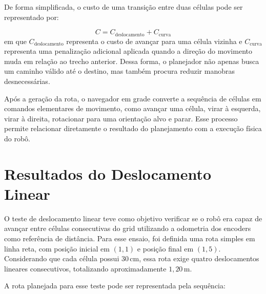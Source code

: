 \documentclass[	12pt, Times, openright, twoside, a4paper, english, brazil]{abntex2}
\begin{document}
De forma simplificada, o custo de uma transição entre duas células pode ser representado por:

\begin{equation}
	C = C_{\text{deslocamento}} + C_{\text{curva}}
	\label{eq:custo_astar_modificado}
\end{equation}
em que \(C_{\text{deslocamento}}\) representa o custo de avançar para uma célula vizinha e \(C_{\text{curva}}\) representa uma penalização adicional aplicada quando a direção do movimento muda em relação ao trecho anterior. Dessa forma, o planejador não apenas busca um caminho válido até o destino, mas também procura reduzir manobras desnecessárias.

Após a geração da rota, o navegador em grade converte a sequência de células em comandos elementares de movimento, como avançar uma célula, virar à esquerda, virar à direita, rotacionar para uma orientação alvo e parar. Esse processo permite relacionar diretamente o resultado do planejamento com a execução física do robô.



\section{Resultados do Deslocamento Linear}
\label{sec:resultados_deslocamento_linear}

O teste de deslocamento linear teve como objetivo verificar se o robô era capaz de avançar entre células consecutivas do grid utilizando a odometria dos encoders como referência de distância. Para esse ensaio, foi definida uma rota simples em linha reta, com posição inicial em \((1,1)\) e posição final em \((1,5)\). Considerando que cada célula possui \(30\,\text{cm}\), essa rota exige quatro deslocamentos lineares consecutivos, totalizando aproximadamente \(1{,}20\,\text{m}\).


A rota planejada para esse teste pode ser representada pela sequência:
\end{document}
